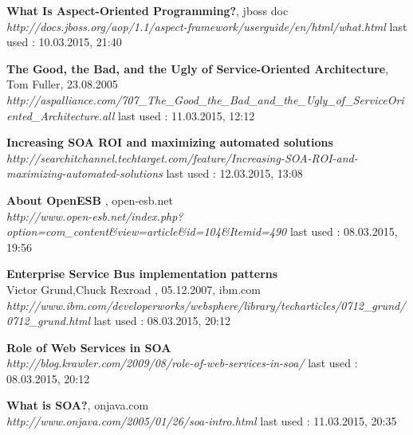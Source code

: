 \documentclass[12pt]{article}
\begin{document}
\begin{thebibliography}{56}
   	 
	\textbf{What Is Aspect-Oriented Programming?}, jboss doc \\
    \textit{http://docs.jboss.org/aop/1.1/aspect-framework/userguide/en/html/what.html 	 }
    \newline last used : 10.03.2015, 21:40  
   	 
	\textbf{The Good, the Bad, and the Ugly of Service-Oriented Architecture}, Tom Fuller, 23.08.2005 \\
    \textit{http://aspalliance.com/707\_The\_Good\_the\_Bad\_and\_the\_Ugly\_of\_ServiceOriented\_Architecture.all}
    \newline last used : 11.03.2015, 12:12  
 	 
  \textbf{Increasing SOA ROI and maximizing automated solutions}\\
  \textit{ 	 http://searchitchannel.techtarget.com/feature/Increasing-SOA-ROI-and-maximizing-automated-solutions}
  \newline last used : 12.03.2015, 13:08


 	 
   	  

 	     	  
   \textbf{About OpenESB }, open-esb.net\\
  \textit{http://www.open-esb.net/index.php?option=com\_content\&view=article\&id=104\&Itemid=490}
  \newline last used : 08.03.2015, 19:56 	 
   	     	     	     	     	     	     	     	  
   	     
   \textbf{Enterprise Service Bus implementation patterns} \\ Victor Grund,Chuck Rexroad , 05.12.2007, ibm.com\\
  \textit{ http://www.ibm.com/developerworks/websphere/library/techarticles/0712\_grund/0712\_grund.html}
  \newline last used : 08.03.2015, 20:12 	   	     
   	     	     	     	 
 	    	     
   \textbf{Role of Web Services in SOA} \\
  \textit{ 	 http://blog.krawler.com/2009/08/role-of-web-services-in-soa/}
  \newline last used : 08.03.2015, 20:12 	   	     
   	     	     	     	 
   	  
     	     	     	 
   \textbf{What is SOA?}, onjava.com \\
  \textit{http://www.onjava.com/2005/01/26/soa-intro.html}
  \newline last used : 11.03.2015, 20:35
 	 

\end{thebibliography}
\end{document}
